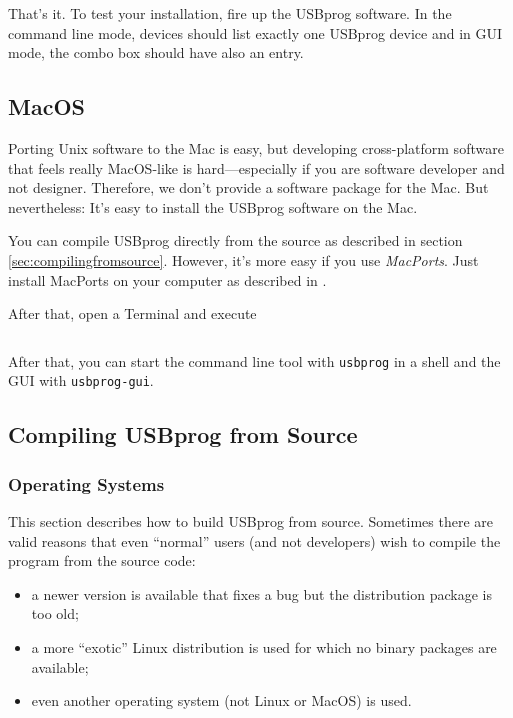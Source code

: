 \documentclass[bibtotoc,UKenglish,halfparskip,oneside,DIV12]{scrreprt}
\begin{document}
That's it. To test your installation, fire up the USBprog software. In the command line mode,
devices should list exactly one USBprog device and in GUI mode, the combo box should have also an
entry.

\subsection{MacOS}

Porting Unix software to the Mac is easy, but developing cross-platform software that feels really
MacOS-like is hard---especially if you are software developer and not designer.  Therefore, we don't
provide a software package for the Mac. But nevertheless: It's easy to install the USBprog software
on the Mac.

You can compile USBprog directly from the source as described in section
\vref{sec:compilingfromsource}. However, it's more easy if you use \emph{MacPorts}. Just install
MacPorts on your computer as described in \cite{InstallingMacports}.

After that, open a Terminal and execute

\begin{lstlisting}[style=inline]
% sudo port install usbprog
\end{lstlisting}

After that, you can start the command line tool with \texttt{usbprog} in a shell and the GUI with
\texttt{usbprog-gui}.


\subsection{Compiling USBprog from Source}
\label{sec:compilingfromsource}

\subsubsection{Operating Systems}

This section describes how to build USBprog from source. Sometimes there are valid reasons that even
``normal'' users (and not developers) wish to compile the program from the source code:

\begin{itemize}
  \item a newer version is available that fixes a bug but the distribution package is too old;
  \item a more ``exotic'' Linux distribution is used for which no binary packages are available;
  \item even another operating system (not Linux or MacOS) is used.
\end{itemize}
\end{document}
